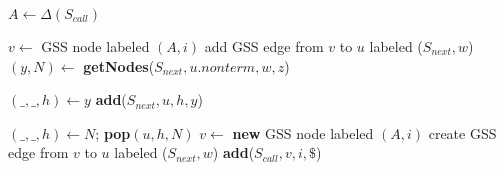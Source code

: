 \begin{algorithmic}    
    \State $A \gets \Delta(S_{call})$
    
        \State $v \gets$ GSS node labeled $(A, i)$
            \State add GSS edge from $v$ to $u$ labeled ($S_{next},w$)
                \State $(y,N) \gets$ \textbf{getNodes}($S_{next}, u.nonterm, w, z$)
                
                \State $(\_, \_, h) \gets y$
                \State \textbf{add}($S_{next} , u, h, y$)
                
                    \State $(\_, \_, h) \gets N$;
                    \textbf{pop}$(u,h,N)$ 
                \EndIf
            \EndFor
        \EndIf
    \Else
        \State $v \gets$ \textbf{new} GSS node labeled $(A, i)$
        \State create GSS edge from $v$ to $u$ labeled ($S_{next}, w$)
        \State \textbf{add}($S_{call}, v, i, \$ $)
    \EndIf
\EndFunction
\end{algorithmic}  
